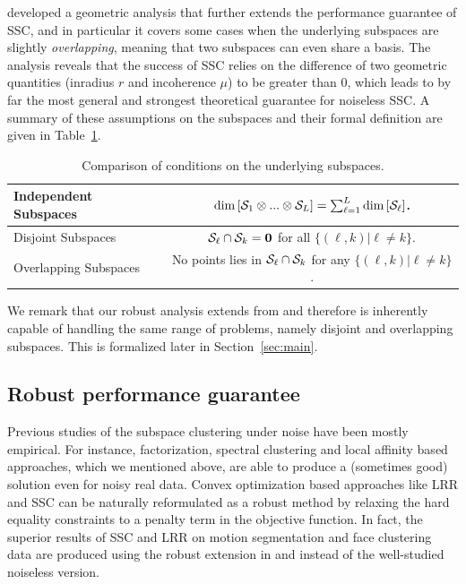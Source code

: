 \documentclass[main]{subfiles}
\begin{document}
\cite{soltanolkotabi2011geometric} developed a geometric analysis that further extends the performance guarantee of SSC, and in particular it covers some cases when the underlying subspaces are slightly \emph{overlapping}, meaning that two subspaces can even share a basis. The analysis reveals that the success of SSC relies on the difference of two geometric quantities (inradius $r$ and incoherence $\mu$) to be greater than $0$, which leads to by far the most general and strongest theoretical guarantee for noiseless SSC. A summary of these assumptions on the subspaces and their formal definition are given in Table~\ref{tab:subspaces}.
\begin{table}
  \centering
\begin{tabular}{|l|c|}
  \hline
  Independent Subspaces & $\mathrm{dim}\left[\mathcal{S}_1\otimes...\otimes \mathcal{S}_L\right] = \sum_{\ell=1}^L \mathrm{dim}\left[\mathcal{S}_\ell\right]  $.  \\\hline
  Disjoint Subspaces &  $\mathcal{S}_\ell\cap \mathcal{S}_k =\mathbf{0}$ for all $\{(\ell,k)|\ell\neq k\}$.\\\hline
  Overlapping Subspaces & No points lies in $\mathcal{S}_\ell\cap \mathcal{S}_k$ for any $\{(\ell,k)|\ell\neq k\}$.\\
  \hline
\end{tabular}
\caption{Comparison of conditions on the underlying subspaces.}\label{tab:subspaces}
\end{table}



We remark that our robust analysis extends from \cite{soltanolkotabi2011geometric} and therefore is inherently capable of handling the same range of problems, namely disjoint and overlapping subspaces. This is formalized later in Section~\ref{sec:main}.

\subsection{Robust performance guarantee}

Previous studies of the subspace clustering under noise have been mostly empirical. For instance, factorization, spectral clustering and local affinity based approaches, which we mentioned above, are able to produce a (sometimes good) solution even for noisy real data. Convex optimization based approaches like LRR and SSC can be naturally reformulated as a robust method by relaxing the hard equality constraints to a penalty term in the objective function. In fact, the superior results of SSC and LRR on motion segmentation and face clustering data are produced using the robust extension in \cite{elhamifar2009ssc} and \cite{liu2010lrr_icml} instead of the well-studied noiseless version.
\end{document}
